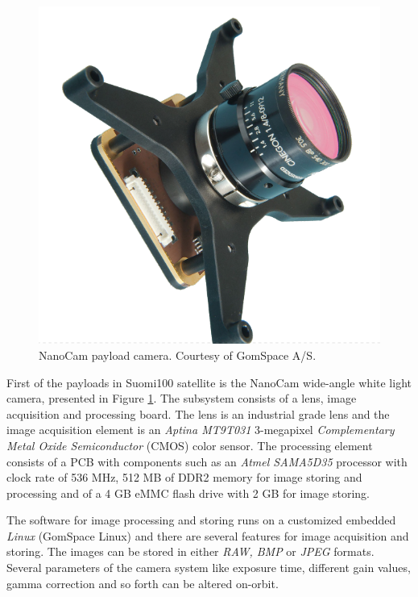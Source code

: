 \documentclass[english,12pt,a4paper,pdftex,elec,utf8]{aaltothesis}
\begin{document}
\begin{figure}[h!]
\centering
\includegraphics[scale=0.2]{nanocam}
\caption{NanoCam payload camera. Courtesy of GomSpace A/S. \cite{nanocamds}}
\label{nanocam}
\end{figure} 
First of the payloads in Suomi100 satellite is the NanoCam wide-angle white light camera, presented in Figure \ref{nanocam}. The subsystem consists of a lens, image acquisition and processing board. The lens is an industrial grade lens and the image acquisition element is an \textit{Aptina MT9T031} 3-megapixel \textit{Complementary Metal Oxide Semiconductor} (CMOS) color sensor. The processing element consists of a PCB with components such as an \textit{Atmel SAMA5D35} processor with clock rate of 536 MHz, 512 MB of DDR2 memory for image storing and processing and of a 4 GB eMMC flash drive with 2 GB for image storing. \cite{nanocamds}\par
The software for image processing and storing runs on a customized embedded \textit{Linux} (GomSpace Linux) and there are several features for image acquisition and storing. The images can be stored in either \textit{RAW, BMP} or \textit{JPEG} formats. Several parameters of the camera system like exposure time, different gain values, gamma correction and so forth can be altered on-orbit. \cite{nanocamds}
\\
\\ 
\end{document}
